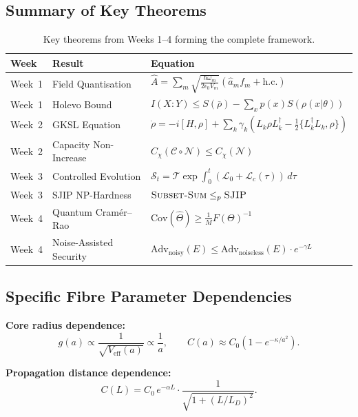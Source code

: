 \documentclass[12pt,a4paper]{article}
\theoremstyle{definition}
\theoremstyle{plain}
\begin{document}
\subsection{Summary of Key Theorems}

\begin{table}[H]
\centering
\caption{Key theorems from Weeks 1--4 forming the complete framework.}
\renewcommand{\arraystretch}{1.4}
\begin{tabular}{llp{6cm}}
\toprule
\textbf{Week} & \textbf{Result} & \textbf{Equation} \\
\midrule
Week~1 & Field Quantisation & $\hat{A}=\sum_m\sqrt{\frac{\hbar\omega_m}{2\epsilon_0 V_m}}(\hat{a}_m f_m+\mathrm{h.c.})$ \\
Week~1 & Holevo Bound & $I(X{:}Y)\le S(\bar\rho)-\sum_x p(x)S(\rho(x|\theta))$ \\
Week~2 & GKSL Equation & $\dot\rho=-i[H,\rho]+\sum_k\gamma_k(L_k\rho L_k^\dagger-\frac{1}{2}\{L_k^\dagger L_k,\rho\})$ \\
Week~2 & Capacity Non-Increase & $C_\chi(\mathcal{C}\circ\mathcal{N})\le C_\chi(\mathcal{N})$ \\
Week~3 & Controlled Evolution & $\mathcal{S}_t=\mathcal{T}\exp\int_0^t(\mathcal{L}_0+\mathcal{L}_c(\tau))\,d\tau$ \\
Week~3 & SJIP NP-Hardness & $\textsc{Subset-Sum}\le_p\textsc{SJIP}$ \\
Week~4 & Quantum Cram\'er--Rao & $\mathrm{Cov}(\hat\Theta)\ge\frac{1}{M}F(\Theta)^{-1}$ \\
Week~4 & Noise-Assisted Security & $\mathrm{Adv}_{\mathrm{noisy}}(E)\le\mathrm{Adv}_{\mathrm{noiseless}}(E)\cdot e^{-\gamma L}$ \\
\bottomrule
\end{tabular}
\end{table}

\subsection{Specific Fibre Parameter Dependencies}

\textbf{Core radius dependence:}
\begin{equation}
g(a)\propto\frac{1}{\sqrt{V_{\mathrm{eff}}(a)}}\propto\frac{1}{a},\qquad
C(a)\approx C_0\!\left(1-e^{-\kappa/a^2}\right).
\end{equation}

\textbf{Propagation distance dependence:}
\begin{equation}
C(L)=C_0\,e^{-\alpha L}\cdot\frac{1}{\sqrt{1+(L/L_D)^2}}.
\end{equation}
\end{document}
